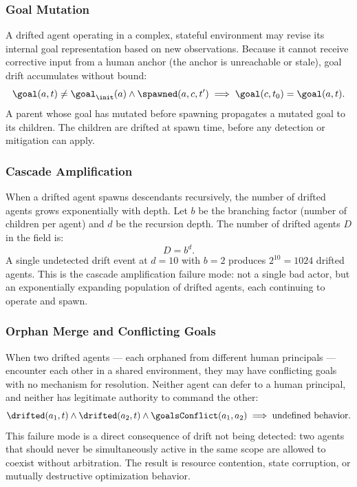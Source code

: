 \subsubsection{Goal Mutation}

A drifted agent operating in a complex, stateful environment may revise its internal goal representation based on new observations. Because it cannot receive corrective input from a human anchor (the anchor is unreachable or stale), goal drift accumulates without bound:
\begin{equation}
\goal(a, t) \neq \goal_{\init}(a) \land \spawned(a, c, t') \implies \goal(c, t_0) = \goal(a, t).
\end{equation}
A parent whose goal has mutated before spawning propagates a mutated goal to its children. The children are drifted at spawn time, before any detection or mitigation can apply.

\subsubsection{Cascade Amplification}

When a drifted agent spawns descendants recursively, the number of drifted agents grows exponentially with depth. Let $b$ be the branching factor (number of children per agent) and $d$ be the recursion depth. The number of drifted agents $D$ in the field is:
\begin{equation}
D = b^d.
\label{eq:cascade-amplification}
\end{equation}
A single undetected drift event at $d = 10$ with $b = 2$ produces $2^{10} = 1024$ drifted agents. This is the cascade amplification failure mode: not a single bad actor, but an exponentially expanding population of drifted agents, each continuing to operate and spawn.

\subsubsection{Orphan Merge and Conflicting Goals}

When two drifted agents — each orphaned from different human principals — encounter each other in a shared environment, they may have conflicting goals with no mechanism for resolution. Neither agent can defer to a human principal, and neither has legitimate authority to command the other:
\begin{equation}
\drifted(a_1, t) \land \drifted(a_2, t) \land \goalsConflict(a_1, a_2) \implies \text{undefined behavior}.
\end{equation}
This failure mode is a direct consequence of drift not being detected: two agents that should never be simultaneously active in the same scope are allowed to coexist without arbitration. The result is resource contention, state corruption, or mutually destructive optimization behavior.

